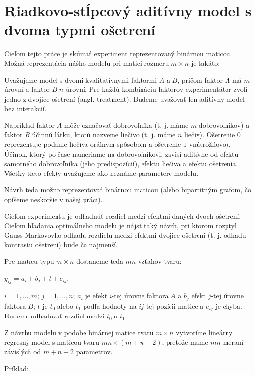 \section{Riadkovo-stĺpcový aditívny model s dvoma typmi ošetrení}
\label{my model}

Cieľom tejto práce je skúmať experiment reprezentovaný binárnou maticou.
Možná reprezentácia nášho modelu pri matici rozmeru $m \times n$ je takáto:

Uvažujeme model s dvomi kvalitatívnymi faktormi $A$ a $B$, 
pričom faktor $A$ má $m$ úrovní a faktor $B$ $n$ úrovní. 
Pre každú kombináciu faktorov experimentátor zvolí jedno z dvojice ošetrení (angl. treatment).
Budeme uvažovať len aditívny model bez interakcií.

Napríklad faktor $A$ môže označovať dobrovoľníka (t. j. máme $m$ dobrovoľníkov) 
a faktor $B$ účinnú látku, ktorú nazveme liečivo (t. j. máme $n$ liečiv). 
Ošetrenie $0$ reprezentuje podanie liečiva orálnym spôsobom a ošetrenie $1$ vnútrožilovo).
Účinok, ktorý po čase nameriame na dobrovoľníkovi, 
závisí aditívne od efektu samotného dobrovoľníka (jeho predispozícií), 
efektu liečiva a efektu ošetrenia. 
Všetky tieto efekty uvažujeme ako neznáme parametere modelu.

Návrh teda možno reprezentovať binárnou maticou 
(alebo bipartitným grafom, čo opíšeme neskoršie v našej práci).

Cieľom experimentu je odhadnúť rozdiel medzi efektmi daných dvoch ošetrení.
Cieľom hľadania optimálneho modelu je nájsť taký návrh, pri ktorom
rozptyl Gauss-Markovovho odhadu rozdielu medzi efektmi dvojice ošetrení (t. j. odhadu kontrastu ošetrení) bude čo najmenší.

Pre maticu typu $m \times n$ dostaneme teda $mn$ vzťahov tvaru:

\begin{center}
$
y_{ij} = a_i + b_j + t + e_{ij}
$,
\end{center}

$i = 1, \ldots, m$; $j = 1, \ldots, n$; $a_i$ je efekt $i$-tej úrovne faktora $A$ a $b_j$ efekt $j$-tej úrovne faktora $B$; $t$ je $t_0$ alebo $t_1$ podľa hodnoty na $ij$-tej pozícii matice a $e_{ij}$ je chyba.
Budeme odhadovať rozdiel medzi $t_0$ a $t_1$.

Z návrhu modelu v podobe binárnej matice tvaru $m \times n$ vytvoríme lineárny regresný model
s maticou tvaru $mn \times (m + n + 2)$, pretože máme $mn$ meraní závislých od $m + n + 2$ parametrov.

Príklad:

